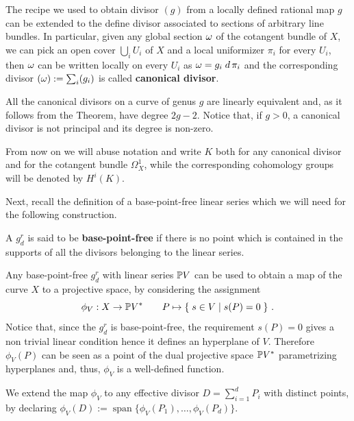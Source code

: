 	The recipe we used to obtain divisor $(g)$ from a locally defined rational map $g$ can be extended to the define divisor associated to sections of arbitrary line bundles. In particular, given any global section $\omega$ of the cotangent bundle of $X$, we can pick an open cover $\bigcup_i U_i$ of $X$ and a local uniformizer $\pi_i$ for every $U_i$, then $\omega$ can be written locally on every $U_i$ as $\omega = g_i \; d\,\pi_i$ and the corresponding divisor $(\omega) := \sum_i (g_i)$ is called \textbf{canonical divisor}.
	\begin{rema}
		All the canonical divisors on a curve of genus $g$ are linearly equivalent and, as it follows from the \RR Theorem, have degree $2g-2$. Notice that, if $g>0$, a canonical divisor is not principal and its degree is non-zero.
	\end{rema}
	\begin{notation}
		From now on we will abuse notation and write $K$ both for any canonical divisor and for the cotangent bundle $\Omega_X^1$, while the corresponding cohomology groups will be denoted by $H^i(K)$.
	\end{notation}
	
	Next, recall the definition of a base-point-free linear series which we will need for the following construction.
	\begin{defi}
		A $g_d^r$ is said to be \textbf{base-point-free} if there is no point which is contained in the supports of all the divisors belonging to the linear series.
	\end{defi}
	Any base-point-free $g_d^r$ with linear series $\mathbb{P} V$ can be used to obtain a map of the curve $X$ to a projective space, by considering the assignment
	$$ \phi_V : X\to \mathbb{P} V^{*} \qquad P\mapsto \left\{\;  s\in V \mid s(P)=0  \; \right\} \,.$$
	Notice that, since the $g_d^r$ is base-point-free, the requirement $s(P)=0$ gives a non trivial linear condition hence it defines an hyperplane of $V$. Therefore $\phi_V(P)$ can be seen as a point of the dual projective space $\mathbb{P} V^*$ parametrizing hyperplanes and, thus, $\phi_V$ is a well-defined function.

	\begin{defi}
		We extend the map $\phi_V$ to any effective divisor $D=\sum_{i=1}^d P_i$ with distinct points, by declaring $ \phi_V(D) := \operatorname{span}\{\phi_V(P_1), \dots, \phi_V(P_d)\}$.
	\end{defi}	

